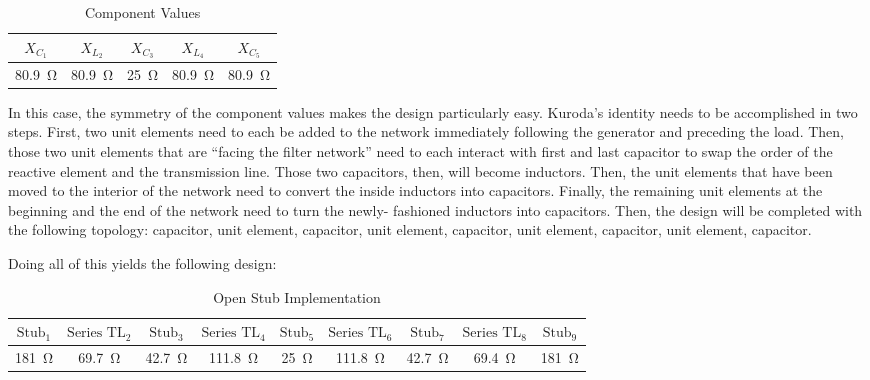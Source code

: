     \begin{table}[h]
        \centering
        \caption{Component Values}
        \label{tab:1a_comp_ractances}
        \begin{tabular}{|c|c|c|c|c|}
            \hline $X_{C_1}$ & $X_{L_2}$  & $X_{C_3}$ & $X_{L_4}$ & $X_{C_5}$ \\
            \hline \SI{80.9}{\ohm}  & \SI{80.9}{\ohm} & \SI{25}{\ohm}  &
            \SI{80.9}{\ohm}  & \SI{80.9}{\ohm} \\
            \hline
        \end{tabular}
    \end{table}

    In this case, the symmetry of the component values makes the design
    particularly easy. Kuroda's identity needs to be accomplished in two steps.
    First, two unit elements need to each be added to the network immediately
    following the generator and preceding the load. Then, those two unit
    elements that are ``facing the filter network'' need to each interact with
    first and last capacitor to swap the order of the reactive element and the
    transmission line. Those two capacitors, then, will become inductors. Then,
    the unit elements that have been moved to the interior of the network need
    to convert the inside inductors into capacitors. Finally, the remaining unit
    elements at the beginning and the end of the network need to turn the newly-
    fashioned inductors into capacitors. Then, the design will be completed with
    the following topology: capacitor, unit element, capacitor, unit element,
    capacitor, unit element, capacitor, unit element, capacitor. 
   
    Doing all of this yields the following design:

    \begin{table}[h]
        \centering
        \caption{Open Stub Implementation}
        \label{tab:1a_open_stub_ideal}
        \begin{tabular}{|c|c|c|c|c|c|c|c|c|}
            \hline $ \text{Stub}_1 $ & $ \text{Series TL}_2 $  & $ \text{Stub}_3
            $ & $ \text{Series TL}_4 $ & $ \text{Stub}_5 $ & 
            $ \text{Series TL}_6 $ & $ \text{Stub}_7 $  & $ \text{Series TL}_8 $
            & $ \text{Stub}_9 $  \\
            \hline \SI{181}{\ohm} & \SI{69.7}{\ohm} & \SI{42.7}{\ohm} &
            \SI{111.8}{\ohm} & \SI{25}{\ohm} & \SI{111.8}{\ohm} &
            \SI{42.7}{\ohm} & \SI{69.4}{\ohm} & \SI{181}{\ohm} \\
            \hline
        \end{tabular}
    \end{table}

